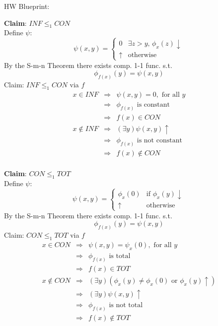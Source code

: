 \documentclass[12pt]{article}
\begin{document}
        \bigskip
        HW Blueprint:
\fi

\noindent
{ \bf Claim}: $ INF \le_1 CON $ \\
Define $\psi$:
\[ \psi(x,y) = \begin{cases} 0 &\exists z > y,\, \phi_x(z) \downarrow \\
  \uparrow &\text{otherwise} \end{cases}
\]
By the S-m-n Theorem there exists comp. 1-1 func. s.t.
	\[\phi_{f(x)}(y) = \psi(x,y)\]
Claim:  $INF \le_1 CON$ via $f$
\proof
\begin{eqnarray*}
	x \in INF &\Rightarrow& \psi(x,y) = 0, \text{ for all } y \\
	&\Rightarrow& \phi_{f(x)} \text{ is constant} \\
        &\Rightarrow& f(x) \in CON \\
        x \notin INF &\Rightarrow& (\exists y) \psi(x,y) \uparrow \\
	&\Rightarrow& \phi_{f(x)} \text{ is not constant} \\
        &\Rightarrow& f(x) \notin CON \\
\end{eqnarray*}

\medskip
\noindent
{ \bf Claim}: $CON \le_1 TOT$ \\
Define $\psi$:
\[ \psi(x,y) = \begin{cases} 
  \phi_x(0)      &\text{if } \phi_x(y) \downarrow \\
  \uparrow      &\text{otherwise} \end{cases}
\]
By the S-m-n Theorem there exists comp. 1-1 func. s.t.
	\[\phi_{f(x)}(y) = \psi(x,y)\]
Claim:  $CON \le_1 TOT$ via $f$
\proof
\begin{eqnarray*}
	x \in CON &\Rightarrow& \psi(x,y) = \psi_x(0), \text{ for all } y \\
	&\Rightarrow& \phi_{f(x)} \text{ is total} \\
        &\Rightarrow& f(x) \in TOT \\
        x \notin CON 
	&\Rightarrow& (\exists y) \left(\phi_x(y) \ne \phi_x(0)
				  \text{ or } \phi_x(y)\uparrow \right) \\
        &\Rightarrow& (\exists y) \psi(x,y)\uparrow \\
	&\Rightarrow& \phi_{f(x)} \text{ is not total} \\
        &\Rightarrow& f(x) \notin TOT
\end{eqnarray*}
\end{document}
